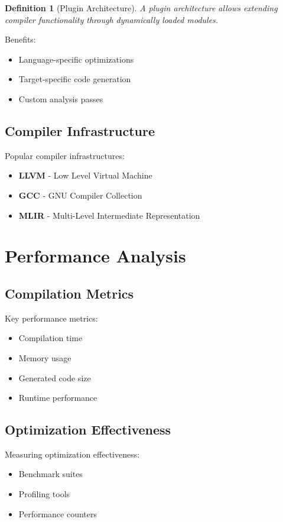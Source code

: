 \documentclass[11pt]{article}
\newtheorem{definition}{Definition}[section]
\begin{document}
\begin{definition}[Plugin Architecture]
A plugin architecture allows extending compiler functionality through dynamically loaded modules.
\end{definition}

Benefits:
\begin{itemize}
    \item Language-specific optimizations
    \item Target-specific code generation
    \item Custom analysis passes
\end{itemize}

\subsection{Compiler Infrastructure}

Popular compiler infrastructures:
\begin{itemize}
    \item \textbf{LLVM} - Low Level Virtual Machine
    \item \textbf{GCC} - GNU Compiler Collection
    \item \textbf{MLIR} - Multi-Level Intermediate Representation
\end{itemize}

\section{Performance Analysis}

\subsection{Compilation Metrics}

Key performance metrics:
\begin{itemize}
    \item Compilation time
    \item Memory usage
    \item Generated code size
    \item Runtime performance
\end{itemize}

\subsection{Optimization Effectiveness}

Measuring optimization effectiveness:
\begin{itemize}
    \item Benchmark suites
    \item Profiling tools
    \item Performance counters
\end{itemize}
\end{document}
